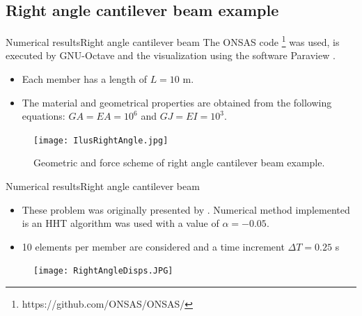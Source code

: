 \documentclass{beamer}
\begin{document}
\subsection{Right angle cantilever beam example}
\begin{frame}{Numerical results}{Right angle cantilever beam}
The ONSAS code \footnote{https://github.com/ONSAS/ONSAS/} was used, is executed by GNU-Octave \cite{Octave} and the visualization using the software Paraview \cite{squillacote2007paraview}. 
\begin{itemize}
\begin{itemize}
  \item Each member has a length of $L=10$ m.  
  \item  The material and geometrical properties are obtained from the following equations: $GA= EA=10^6$ and $GJ = EI =10^3$.  
\end{itemize}
\end{itemize}
\begin{figure}[H]
  \centering
    \texttt{[image: IlusRightAngle.jpg]}
  \caption{Geometric and force scheme of right angle cantilever beam example.}
 \end{figure}

\end{frame}

\begin{frame}{Numerical results}{Right angle cantilever beam}
\begin{itemize}
    \item These problem was originally presented by \cite{simo1988dynamics}.
    \itemThe Numerical method implemented is an HHT algorithm was used with a value of $\alpha=-0.05$.
    \item 10 elements per member are considered and a time increment $\Delta T = 0.25$ s
\end{itemize}
 
\pause
\begin{figure}[H]
  \centering
    \texttt{[image: RightAngleDisps.JPG]}
 \end{figure}

\end{frame}


\end{document}
